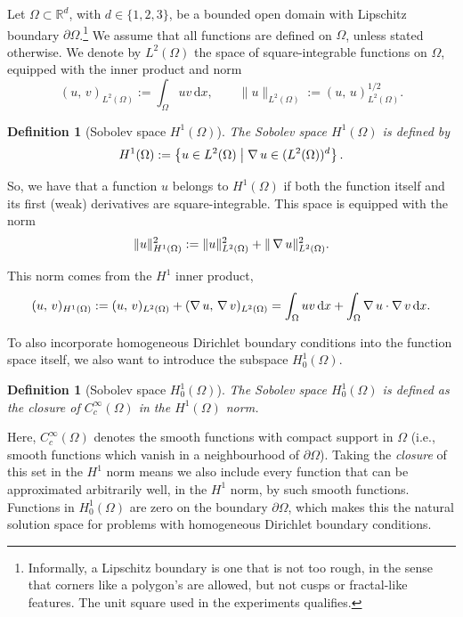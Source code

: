 \documentclass[a4paper,11pt]{article}
\newcommand{\R}{\mathbb{R}}
\newcommand{\Om}{\Omega}
\newcommand{\dom}{\partial\Omega}
\newcommand{\Lp}[1]{L^{2}(#1)}              %
\newcommand{\inner}[3]{(#1,\,#2)_{#3}}        %
\newcommand{\dx}{\,\mathrm{d}x}
\theoremstyle{spacedplain} \newtheorem{theorem}[counter]{Theorem} \newtheorem{lemma}[counter]{Lemma} \newtheorem{prop}[counter]{Proposition} \newtheorem{cor}[counter]{Corollary}
\theoremstyle{spaceddefinition} \newtheorem{defn}[counter]{Definition} \newtheorem{example}[counter]{Example} \newtheorem{remark}[counter]{Remark}
\begin{document}
Let $\Om \subset \R^d$, with $d \in \{1, 2, 3\}$, be a bounded open domain with Lipschitz boundary $\dom$.\footnote{Informally, a Lipschitz boundary is one that is not too rough, in the sense that corners like a polygon's are allowed, but not cusps or fractal-like features. The unit square used in the experiments qualifies.} We assume that all functions are defined on $\Om$, unless stated otherwise. We denote by $\Lp{\Om}$ the space of square-integrable functions on $\Om$, equipped with the inner product and norm
\begin{equation}
  \inner{u}{v}{\Lp{\Om}} := \int_{\Om} u v \dx,
  \qquad
  \|u\|_{\Lp{\Om}} := \inner{u}{u}{\Lp{\Om}}^{1/2}.
\end{equation}

\begin{defn}[Sobolev space \texorpdfstring{$H^1(\Om)$}{H1}] The \emph{Sobolev space} $H^1(\Om)$ is defined by
\begin{equation}
  H^1(\Om) := \left\{ u \in \Lp{\Om} \;\middle|\;
                      \grad u \in (\Lp{\Om})^d \right\}.
\end{equation}
\end{defn}

So, we have that a function $u$ belongs to $H^1(\Om)$ if both the function itself and its first (weak) derivatives are square-integrable. This space is equipped with the norm
\begin{equation}
  \|u\|_{H^1(\Om)}^2
    := \|u\|_{\Lp{\Om}}^2 + \|\grad u\|_{\Lp{\Om}}^2.
\end{equation}

This norm comes from the $H^1$ inner product,
\begin{equation}
  \inner{u}{v}{H^1(\Om)} := \inner{u}{v}{\Lp{\Om}} + \inner{\grad u}{\grad v}{\Lp{\Om}}
    = \int_{\Om} u v \dx + \int_{\Om} \grad u \cdot \grad v \dx.
\end{equation}

To also incorporate homogeneous Dirichlet boundary conditions into the function space itself, we also want to introduce the subspace $H_0^1(\Om)$.

\begin{defn}[Sobolev space \texorpdfstring{$H_0^1(\Om)$}{H10}] The \emph{Sobolev space} $H_0^1(\Om)$ is defined as the closure of $C_c^\infty(\Om)$ in the $H^1(\Om)$ norm.
\end{defn}

Here, $C_c^\infty(\Om)$ denotes the smooth functions with compact support in $\Om$ (i.e., smooth functions which vanish in a neighbourhood of $\dom$). Taking the \emph{closure} of this set in the $H^1$ norm means we also include every function that can be approximated arbitrarily well, in the $H^1$ norm, by such smooth functions. Functions in $H_0^1(\Om)$ are zero on the boundary $\dom$, which makes this the natural solution space for problems with homogeneous Dirichlet boundary conditions.
\end{document}
